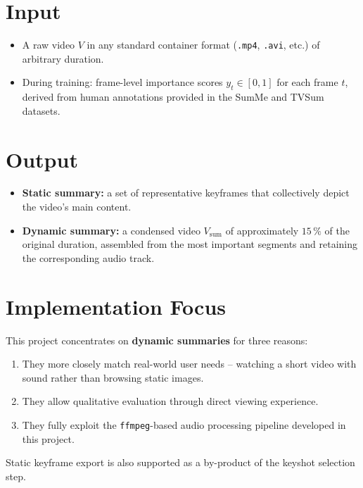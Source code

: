 \documentclass[12pt, a4paper]{report}
\begin{document}
\section{Input}

\begin{itemize}
  \item A raw video $V$ in any standard container format (\texttt{.mp4}, \texttt{.avi},
        etc.) of arbitrary duration.
  \item During training: frame-level importance scores $y_t \in [0,1]$ for each frame
        $t$, derived from human annotations provided in the SumMe and TVSum datasets.
\end{itemize}

\section{Output}

\begin{itemize}
  \item \textbf{Static summary:} a set of representative keyframes that collectively
        depict the video's main content.
  \item \textbf{Dynamic summary:} a condensed video $V_{\text{sum}}$ of approximately
        $15\,\%$ of the original duration, assembled from the most important segments
        and retaining the corresponding audio track.
\end{itemize}

\section{Implementation Focus}

This project concentrates on \textbf{dynamic summaries} for three reasons:
\begin{enumerate}
  \item They more closely match real-world user needs -- watching a short video with
        sound rather than browsing static images.
  \item They allow qualitative evaluation through direct viewing experience.
  \item They fully exploit the \texttt{ffmpeg}-based audio processing pipeline
        developed in this project.
\end{enumerate}

Static keyframe export is also supported as a by-product of the keyshot selection step.

\end{document}
